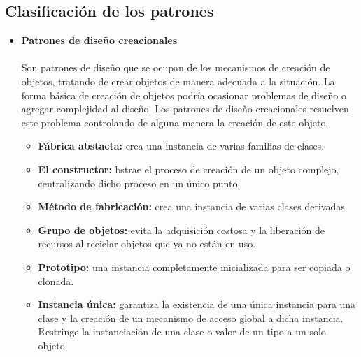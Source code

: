 \documentclass[twoside,twocolumn]{article}
\begin{document}
\subsection{Clasificación de los patrones}
\begin{itemize}
	\item \textbf{Patrones de diseño creacionales}
	\\
	\\Son patrones de diseño que se ocupan de los mecanismos de creación de objetos, tratando de crear objetos de manera adecuada a la situación. La forma básica de creación de objetos podría ocasionar problemas de diseño o agregar complejidad al diseño. Los patrones de diseño creacionales resuelven este problema controlando de alguna manera la creación de este objeto.\cite{Tanembaum2}
	\begin{itemize}
		\item \textbf{Fábrica abstacta:}	crea una instancia de varias familias de clases.
		\item \textbf{El constructor:} bstrae el proceso de creación de un objeto complejo, centralizando dicho proceso en un único punto.
		\item \textbf{Método de fabricación:} crea una instancia de varias clases derivadas.
		\item \textbf{Grupo de objetos:}	evita la adquisición costosa y la liberación de recursos al reciclar objetos que ya no están en uso.
		\item \textbf{Prototipo:} una instancia completamente inicializada para ser copiada o clonada.
		\item \textbf{Instancia única:} garantiza la existencia de una única instancia para una clase y la creación de un mecanismo de acceso global a dicha instancia. Restringe la instanciación de una clase o valor de un tipo a un solo objeto.
	\end{itemize}
	

\end{itemize}
\end{document}
